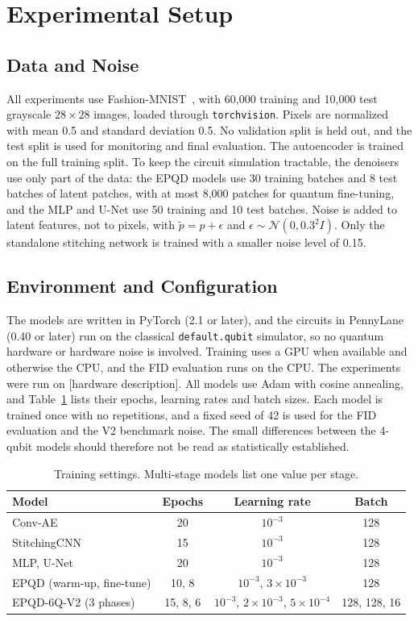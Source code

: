 \section{Experimental Setup}\label{sec:setup}

\subsection{Data and Noise}
All experiments use Fashion-MNIST~\cite{fmnist}, with 60{,}000 training and 10{,}000 test grayscale $28\times28$ images, loaded through \texttt{torchvision}. Pixels are normalized with mean 0.5 and standard deviation 0.5. No validation split is held out, and the test split is used for monitoring and final evaluation. The autoencoder is trained on the full training split. To keep the circuit simulation tractable, the denoisers use only part of the data: the EPQD models use 30 training batches and 8 test batches of latent patches, with at most 8{,}000 patches for quantum fine-tuning, and the MLP and U-Net use 50 training and 10 test batches. Noise is added to latent features, not to pixels, with $\tilde p=p+\epsilon$ and $\epsilon\sim\mathcal{N}(0,0.3^2I)$. Only the standalone stitching network is trained with a smaller noise level of 0.15.

\subsection{Environment and Configuration}
The models are written in PyTorch (2.1 or later), and the circuits in PennyLane (0.40 or later) run on the classical \texttt{default.qubit} simulator, so no quantum hardware or hardware noise is involved. Training uses a GPU when available and otherwise the CPU, and the FID evaluation runs on the CPU. The experiments were run on [hardware description]. All models use Adam with cosine annealing, and Table~\ref{tab:hyper} lists their epochs, learning rates and batch sizes. Each model is trained once with no repetitions, and a fixed seed of 42 is used for the FID evaluation and the V2 benchmark noise. The small differences between the 4-qubit models should therefore not be read as statistically established.

\begin{table}[t]
\centering
\caption{Training settings. Multi-stage models list one value per stage.}
\label{tab:hyper}
\begin{tabular}{lccc}
\toprule
\textbf{Model} & \textbf{Epochs} & \textbf{Learning rate} & \textbf{Batch}\\
\midrule
Conv-AE & 20 & $10^{-3}$ & 128\\
StitchingCNN & 15 & $10^{-3}$ & 128\\
MLP, U-Net & 20 & $10^{-3}$ & 128\\
EPQD (warm-up, fine-tune) & 10, 8 & $10^{-3}$, $3\times10^{-3}$ & 128\\
EPQD-6Q-V2 (3 phases) & 15, 8, 6 & $10^{-3}$, $2\times10^{-3}$, $5\times10^{-4}$ & 128, 128, 16\\
\bottomrule
\end{tabular}
\end{table}


